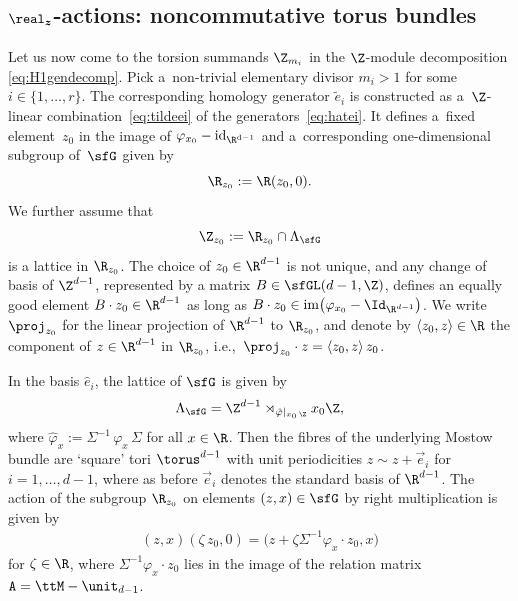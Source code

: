 \subsection[$\real_z$-actions: noncommutative torus bundles]{$\boldsymbol{\real_z}$-actions: noncommutative torus bundles}\label{sec:Rzgen}

Let us now come to the torsion summands $\Z_{m_i}$ in the
$\Z$-module decomposition \eqref{eq:H1gendecomp}. Pick a~non-trivial
elementary divisor $m_i>1$ for some $i\in\{1,\dots,r\}$. The
corresponding homology generator $\tilde e_i$ is constructed as a~$\Z$-linear combination~\eqref{eq:tildeei} of the generators~\eqref{eq:hatei}. It defines a~fixed
element~$z_0$ in the image of $\varphi_{x_0}-\rm{id}_{\R^{d-1}}$ and a~corresponding one-dimensional subgroup of~$\sfG$ given by
\[
\R_{z_0} := \R (z_0,0) .
\]
We further assume that
\[
\Z_{ z_0} := \R_{ z_0}\cap\Lambda_\sfG
\]
is a lattice in $\R_{z_0}$.
The choice of $z_0\in\R^{d-1}$ is not unique, and
any change of basis of $\Z^{d-1}$, represented by a matrix
$B\in\sfGL(d-1,\Z)$, defines an equally good element $B\cdot
z_0\in\R^{d-1}$ as long as $B\cdot
z_0\in{\rm im}\big(\varphi_{x_0}-\Id_{\R^{d-1}}\big)$. We write $\proj_{z_0}$ for the
linear projection of $\R^{d-1}$ to $\R_{z_0}$, and denote by $\langle
z_0,z\rangle\in\R$ the component of $z\in\R^{d-1}$ in $\R_{z_0}$,
i.e.,~$\proj_{z_0}\cdot z = \langle z_0,z\rangle \, z_0$.

In the basis $\hat e_i$, the lattice of $\sfG$ is given by
\[
\Lambda_\sfG=\Z^{d-1}\rtimes_{\hat\varphi|_{x_0\,\Z}} x_0 \Z ,
\]
where $\hat\varphi_x:=\Sigma^{-1}\,\varphi_x\,\Sigma$ for all
$x\in\R$. Then the fibres of the underlying Mostow bundle are `square' tori
$\torus^{d-1}$ with unit periodicities $ z\sim z+\vec
e_i$ for $i=1,\dots,d-1$, where as
before $\vec e_i$ denotes the standard basis of
$\R^{d-1}$. The action of the
subgroup $\R_{ z_0}$ on
elements $(z,x)\in\sfG$ by right multiplication is given by
\begin{gather}\label{eq:Rz0action}
(z,x) (\zeta\,z_0,0) = \big(z+\zeta \Sigma^{-1} \varphi_x\cdot
z_0,x\big)
\end{gather}
for $\zeta\in\R$, where $\Sigma^{-1} \varphi_x\cdot z_0$ lies in the
image of the relation matrix ${\tt A}=\ttM-\unit_{d-1}$.

